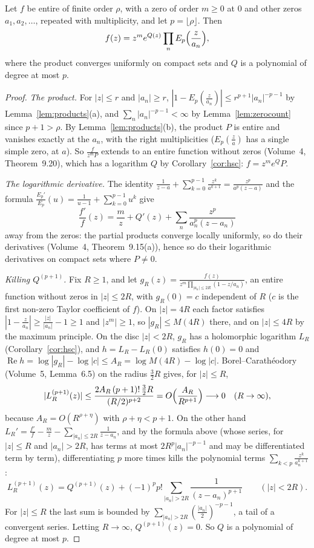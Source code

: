 \begin{theorem}\label{thm:hadamardgen}
Let $f$ be entire of finite order $\rho$, with a zero of order $m\ge0$ at $0$ and other zeros $a_1,a_2,\dots$, repeated with multiplicity, and let $p=\lfloor\rho\rfloor$. Then
\[
f(z)=z^me^{Q(z)}\prod_nE_p\Bigl(\frac z{a_n}\Bigr),
\]
where the product converges uniformly on compact sets and $Q$ is a polynomial of degree at most $p$.
\end{theorem}
\begin{proof}
\emph{The product.} For $|z|\le r$ and $|a_n|\ge r$, $|1-E_p(\frac z{a_n})|\le r^{p+1}|a_n|^{-p-1}$ by Lemma~\ref{lem:products}(a), and $\sum_n|a_n|^{-p-1}<\infty$ by Lemma~\ref{lem:zerocount} since $p+1>\rho$. By
Lemma~\ref{lem:products}(b), the product $P$ is entire and vanishes exactly at the $a_n$, with the right multiplicities ($E_p(\frac z a)$ has a single simple zero, at $a$). So $\frac f{z^mP}$ extends to an entire
function without zeros (Volume~4, Theorem~9.20), which has a logarithm $Q$ by Corollary~\ref{cor:hsc}: $f=z^me^QP$.

\emph{The logarithmic derivative.} The identity $\frac1{z-a}+\sum_{k=0}^{p-1}\frac{z^k}{a^{k+1}}=\frac{z^p}{a^p(z-a)}$ and the formula $\frac{E_p'}{E_p}(u)=\frac1{u-1}+\sum_{k=0}^{p-1}u^k$ give
\[
\frac{f'}f(z)=\frac mz+Q'(z)+\sum_n\frac{z^p}{a_n^p(z-a_n)}
\]
away from the zeros: the partial products converge locally uniformly, so do their derivatives (Volume~4, Theorem~9.15(a)), hence so do their logarithmic derivatives on compact sets where $P\ne0$.

\emph{Killing $Q^{(p+1)}$.} Fix $R\ge1$, and let $g_R(z)=\frac{f(z)}{z^m\prod_{|a_n|\le2R}(1-z/a_n)}$, an entire function without zeros in $|z|\le2R$, with $g_R(0)=c$ independent of $R$ ($c$ is the first non-zero
Taylor coefficient of $f$). On $|z|=4R$ each factor satisfies $|1-\frac z{a_n}|\ge\frac{|z|}{|a_n|}-1\ge1$ and $|z^m|\ge1$, so $|g_R|\le M(4R)$ there, and on $|z|\le4R$ by the maximum principle. On the disc $|z|<2R$, $g_R$ has
a holomorphic logarithm $L_R$ (Corollary~\ref{cor:hsc}), and $h=L_R-L_R(0)$ satisfies $h(0)=0$ and $\operatorname{Re}h=\log|g_R|-\log|c|\le A_R=\log M(4R)-\log|c|$. Borel--Carath\'eodory (Volume~5, Lemma~6.5) on the
radius $\frac32R$ gives, for $|z|\le R$,
\[
|L_R^{(p+1)}(z)|\le\frac{2A_R\,(p+1)!\,\frac32R}{(R/2)^{p+2}}=O\Bigl(\frac{A_R}{R^{p+1}}\Bigr)\longrightarrow0\quad(R\to\infty),
\]
because $A_R=O(R^{\rho+\eta})$ with $\rho+\eta<p+1$. On the other hand $L_R'=\frac{f'}f-\frac mz-\sum_{|a_n|\le2R}\frac1{z-a_n}$, and by the formula above (whose series, for $|z|\le R$ and $|a_n|>2R$, has terms at most $2R^p|a_n|^{-p-1}$ and may be differentiated term by term), differentiating $p$ more
times kills the polynomial terms $\sum_{k<p}\frac{z^k}{a_n^{k+1}}$:
\[
L_R^{(p+1)}(z)=Q^{(p+1)}(z)+(-1)^pp!\sum_{|a_n|>2R}\frac1{(z-a_n)^{p+1}}\qquad(|z|<2R).
\]
For $|z|\le R$ the last sum is bounded by $\sum_{|a_n|>2R}(\frac{|a_n|}2)^{-p-1}$, a tail of a convergent series. Letting $R\to\infty$, $Q^{(p+1)}(z)=0$. So $Q$ is a polynomial of degree at most $p$.
\end{proof}

